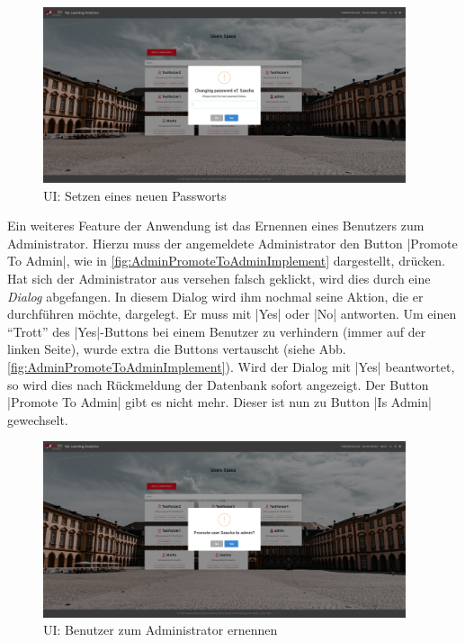 \begin{figure}[!htb]
	\centering
	\includegraphics[width=0.95\textwidth, keepaspectratio]{img/client/AdmiSetPasswordOfUser.png}
	\captionsetup{justification=centering, format=plain}
	\caption[\acf{UI}: Setzen eines neuen Passworts]{\acf{UI}: Setzen eines neuen Passworts \\ \quelleScreenshot}
	\label{fig:AdminSetNewPasswordImplement}
\end{figure}

Ein weiteres Feature der Anwendung ist das Ernennen eines Benutzers zum Administrator. 
Hierzu muss der angemeldete Administrator den Button \jinline|Promote To Admin|, wie in \abb \vref{fig:AdminPromoteToAdminImplement} dargestellt, drücken. 
Hat sich der Administrator aus versehen falsch geklickt, wird dies durch eine \emph{Dialog} abgefangen. 
In diesem Dialog wird ihm nochmal seine Aktion, die er durchführen möchte, dargelegt. 
Er muss mit \jinline|Yes| oder \jinline|No| antworten. 
Um einen \enquote{Trott} des \jinline|Yes|-Buttons bei einem Benutzer zu verhindern (immer auf der linken Seite), wurde extra die Buttons vertauscht (siehe Abb. \vref{fig:AdminPromoteToAdminImplement}).\newline
Wird der Dialog mit \jinline|Yes| beantwortet, so wird dies nach Rückmeldung der Datenbank sofort angezeigt. 
Der Button \jinline|Promote To Admin| gibt es nicht mehr. 
Dieser ist nun zu Button \jinline|Is Admin| gewechselt.

\begin{figure}[!htb]
	\centering
	\includegraphics[width=0.95\textwidth, keepaspectratio]{img/client/AdminPromoteToAdmin.png}
	\captionsetup{justification=centering, format=plain}
	\caption[\acf{UI}: Benutzer zum Administrator ernennen]{\acf{UI}: Benutzer zum Administrator ernennen \\ \quelleScreenshot}
	\label{fig:AdminPromoteToAdminImplement}
\end{figure}



